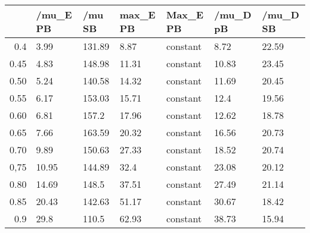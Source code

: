 \begin{table}[ht]
\centering
\begin{tabular}{rllllll}
  \hline
 & /mu\_E PB & /mu SB & max\_E PB & Max\_E PB & /mu\_D pB & /mu\_D SB \\ 
  \hline
0.4 & 3.99 & 131.89 & 8.87 & constant & 8.72 & 22.59 \\ 
  0.45 & 4.83 & 148.98 & 11.31 & constant & 10.83 & 23.45 \\ 
  0.50 & 5.24 & 140.58 & 14.32 & constant & 11.69 & 20.45 \\ 
  0.55 & 6.17 & 153.03 & 15.71 & constant & 12.4 & 19.56 \\ 
  0.60 & 6.81 & 157.2 & 17.96 & constant & 12.62 & 18.78 \\ 
  0.65 & 7.66 & 163.59 & 20.32 & constant & 16.56 & 20.73 \\ 
  0.70 & 9.89 & 150.63 & 27.33 & constant & 18.52 & 20.74 \\ 
  0,75 & 10.95 & 144.89 & 32.4 & constant & 23.08 & 20.12 \\ 
  0.80 & 14.69 & 148.5 & 37.51 & constant & 27.49 & 21.14 \\ 
  0.85 & 20.43 & 142.63 & 51.17 & constant & 30.67 & 18.42 \\ 
  0.9 & 29.8 & 110.5 & 62.93 & constant & 38.73 & 15.94 \\ 
   \hline
\end{tabular}
\end{table}
